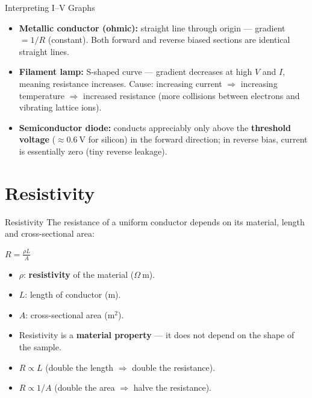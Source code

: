 \begin{keybox}{Interpreting I--V Graphs}
\begin{itemize}[itemsep=2pt]
  \item \textbf{Metallic conductor (ohmic):} straight line through origin — gradient $= 1/R$ (constant). Both forward and reverse biased sections are identical straight lines.
  \item \textbf{Filament lamp:} S-shaped curve — gradient decreases at high $V$ and $I$, meaning resistance increases. Cause: increasing current $\Rightarrow$ increasing temperature $\Rightarrow$ increased resistance (more collisions between electrons and vibrating lattice ions).
  \item \textbf{Semiconductor diode:} conducts appreciably only above the \textbf{threshold voltage} ($\approx 0.6\ \text{V}$ for silicon) in the forward direction; in reverse bias, current is essentially zero (tiny reverse leakage).
\end{itemize}
\end{keybox}

\section{Resistivity}

\begin{formulabox}{Resistivity}
The resistance of a uniform conductor depends on its material, length and cross-sectional area:
\begin{center}
\Large $R = \frac{\rho L}{A}$
\end{center}
\vspace{0.3em}
\begin{itemize}[itemsep=2pt]
  \item $\rho$: \textbf{resistivity} of the material ($\Omega\ \text{m}$).
  \item $L$: length of conductor (m).
  \item $A$: cross-sectional area (m$^2$).
  \item Resistivity is a \textbf{material property} — it does not depend on the shape of the sample.
  \item $R \propto L$ (double the length $\Rightarrow$ double the resistance).
  \item $R \propto 1/A$ (double the area $\Rightarrow$ halve the resistance).
\end{itemize}
\end{formulabox}



